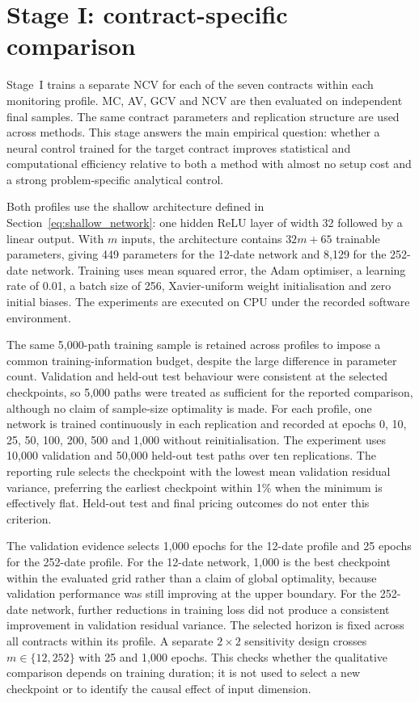 \section{Stage I: contract-specific comparison}

Stage~I trains a separate NCV for each of the seven contracts within each monitoring profile. MC, AV, GCV and NCV are then evaluated on independent final samples. The same contract parameters and replication structure are used across methods. This stage answers the main empirical question: whether a neural control trained for the target contract improves statistical and computational efficiency relative to both a method with almost no setup cost and a strong problem-specific analytical control.

Both profiles use the shallow architecture defined in Section~\ref{eq:shallow_network}: one hidden ReLU layer of width 32 followed by a linear output. With $m$ inputs, the architecture contains $32m + 65$ trainable parameters, giving 449 parameters for the 12-date network and 8{,}129 for the 252-date network. Training uses mean squared error, the Adam optimiser, a learning rate of 0.01, a batch size of 256, Xavier-uniform weight initialisation and zero initial biases. The experiments are executed on CPU under the recorded software environment.

The same 5{,}000-path training sample is retained across profiles to impose a common training-information budget, despite the large difference in parameter count. Validation and held-out test behaviour were consistent at the selected checkpoints, so 5{,}000 paths were treated as sufficient for the reported comparison, although no claim of sample-size optimality is made. For each profile, one network is trained continuously in each replication and recorded at epochs 0, 10, 25, 50, 100, 200, 500 and 1{,}000 without reinitialisation. The experiment uses 10{,}000 validation and 50{,}000 held-out test paths over ten replications. The reporting rule selects the checkpoint with the lowest mean validation residual variance, preferring the earliest checkpoint within 1\% when the minimum is effectively flat. Held-out test and final pricing outcomes do not enter this criterion.

The validation evidence selects 1{,}000 epochs for the 12-date profile and 25 epochs for the 252-date profile. For the 12-date network, 1{,}000 is the best checkpoint within the evaluated grid rather than a claim of global optimality, because validation performance was still improving at the upper boundary. For the 252-date network, further reductions in training loss did not produce a consistent improvement in validation residual variance. The selected horizon is fixed across all contracts within its profile. A separate $2 \times 2$ sensitivity design crosses $m \in \{12, 252\}$ with 25 and 1{,}000 epochs. This checks whether the qualitative comparison depends on training duration; it is not used to select a new checkpoint or to identify the causal effect of input dimension.

